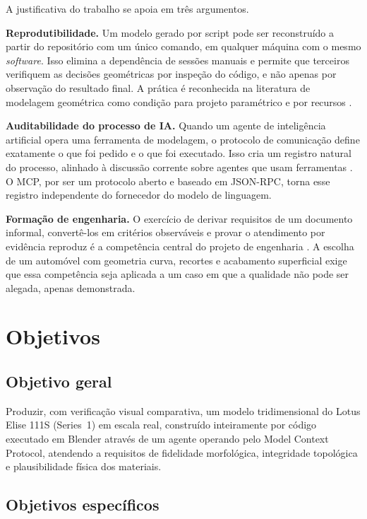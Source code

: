 A justificativa do trabalho se apoia em tr\^es argumentos.

\textbf{Reprodutibilidade.} Um modelo gerado por script pode ser reconstru\'ido a partir do
reposit\'orio com um \'unico comando, em qualquer m\'aquina com o mesmo \emph{software}. Isso
elimina a depend\^encia de sess\~oes manuais e permite que terceiros verifiquem as decis\~oes
geom\'etricas por inspe\c{c}\~ao do c\'odigo, e n\~ao apenas por observa\c{c}\~ao do resultado
final. A pr\'atica \'e reconhecida na literatura de modelagem geom\'etrica como condi\c{c}\~ao
para projeto param\'etrico e por recursos \cite{shah1995, piegl1997}.

\textbf{Auditabilidade do processo de IA.} Quando um agente de intelig\^encia artificial opera
uma ferramenta de modelagem, o protocolo de comunica\c{c}\~ao define exatamente o que foi pedido
e o que foi executado. Isso cria um registro natural do processo, alinhado \`a discuss\~ao
corrente sobre agentes que usam ferramentas \cite{schick2023, patil2023, yao2023}. O MCP, por
ser um protocolo aberto e baseado em JSON-RPC, torna esse registro independente do fornecedor do
modelo de linguagem.

\textbf{Forma\c{c}\~ao de engenharia.} O exerc\'icio de derivar requisitos de um documento
informal, convert\^e-los em crit\'erios observ\'aveis e provar o atendimento por evid\^encia
reproduz \'e a compet\^encia central do projeto de engenharia \cite{pahl2007, otto2001}. A
escolha de um autom\'ovel com geometria curva, recortes e acabamento superficial exige que essa
compet\^encia seja aplicada a um caso em que a qualidade n\~ao pode ser alegada, apenas
demonstrada.

\section{Objetivos}

\subsection{Objetivo geral}

Produzir, com verifica\c{c}\~ao visual comparativa, um modelo tridimensional do Lotus Elise 111S
(Series~1) em escala real, constru\'ido inteiramente por c\'odigo executado em Blender atrav\'es
de um agente operando pelo Model Context Protocol, atendendo a requisitos de fidelidade
morfol\'ogica, integridade topol\'ogica e plausibilidade f\'isica dos materiais.

\subsection{Objetivos espec\'ificos}

